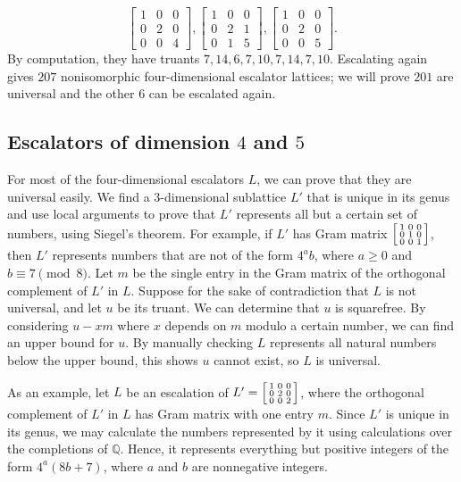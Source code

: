 \documentclass{article}
\begin{document}
\[\begin{bmatrix} 1 & 0 & 0 \\ 0 & 2 & 0 \\ 0 & 0 & 4 \end{bmatrix}, \begin{bmatrix} 1 & 0 & 0 \\ 0 & 2 & 1 \\ 0 & 1 & 5 \end{bmatrix}, \begin{bmatrix} 1 & 0 & 0 \\ 0 & 2 & 0 \\ 0 & 0 & 5 \end{bmatrix}.\]
By computation, they have truants $7, 14, 6, 7, 10, 7, 14, 7, 10$. Escalating again gives $207$ nonisomorphic four-dimensional escalator lattices; we will prove $201$ are universal and the other $6$ can be escalated again.

\subsection{Escalators of dimension $4$ and $5$}
For most of the four-dimensional escalators $L$, we can prove that they are universal easily. We find a $3$-dimensional sublattice $L'$ that is unique in its genus and use local arguments to prove that $L'$ represents all but a certain set of numbers, using Siegel's theorem.
For example, if $L'$ has Gram matrix $\begin{bsmallmatrix} 1 & 0 & 0 \\ 0 & 1 & 0 \\ 0 & 0 & 1 \end{bsmallmatrix}$, then $L'$ represents numbers that are not of the form $4^a b$, where $a \ge 0$ and $b \equiv 7 \pmod 8$. Let $m$ be the single entry in the Gram matrix of the orthogonal complement of $L'$ in $L$. Suppose for the sake of contradiction that $L$ is not universal, and let $u$ be its truant. We can determine that $u$ is squarefree. By considering $u - xm$ where $x$ depends on $m$ modulo a certain number, we can find an upper bound for $u$. By manually checking $L$ represents all natural numbers below the upper bound, this shows $u$ cannot exist, so $L$ is universal.

As an example, let $L$ be an escalation of $L' = \begin{bsmallmatrix} 1 & 0 & 0 \\ 0 & 2 & 0 \\ 0 & 0 & 2 \end{bsmallmatrix}$, where the orthogonal complement of $L'$ in $L$ has Gram matrix with one entry $m$. Since $L'$ is unique in its genus, we may calculate the numbers represented by it using calculations over the completions of $\mathbb{Q}$. Hence, it represents everything but positive integers of the form $4^a (8b + 7)$, where $a$ and $b$ are nonnegative integers.
\end{document}
